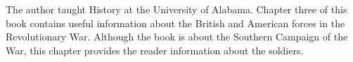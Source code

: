 
The author taught History at the University of Alabama.  Chapter three of this
book contains useful information about the British and American forces in the
Revolutionary War. Although the book is about the Southern Campaign of the
War, this chapter provides the reader information about the soldiers.
